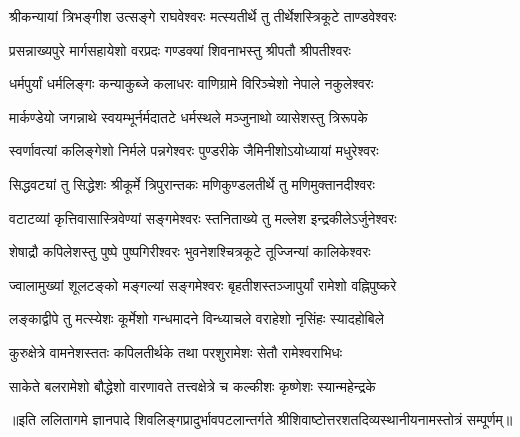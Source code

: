 \twolineshloka
{श्रीकन्यायां त्रिभङ्गीश उत्सङ्गे राघवेश्वरः}
{मत्स्यतीर्थे तु तीर्थेशस्त्रिकूटे ताण्डवेश्वरः}

\twolineshloka
{प्रसन्नाख्यपुरे मार्गसहायेशो वरप्रदः}
{गण्डक्यां शिवनाभस्तु श्रीपतौ श्रीपतीश्वरः}


\twolineshloka
{धर्मपुर्यां धर्मलिङ्गः कन्याकुब्जे कलाधरः}
{वाणिग्रामे विरिञ्चेशो नेपाले नकुलेश्वरः}

\twolineshloka
{मार्कण्डेयो जगन्नाथे स्वयम्भूर्नर्मदातटे}
{धर्मस्थले मञ्जुनाथो व्यासेशस्तु त्रिरूपके}

\twolineshloka
{स्वर्णावत्यां कलिङ्गेशो निर्मले पन्नगेश्वरः}
{पुण्डरीके जैमिनीशोऽयोध्यायां मधुरेश्वरः}

\twolineshloka
{सिद्धवट्यां तु सिद्धेशः श्रीकूर्मे त्रिपुरान्तकः}
{मणिकुण्डलतीर्थे तु मणिमुक्तानदीश्वरः}

\twolineshloka
{वटाटव्यां कृत्तिवासास्त्रिवेण्यां सङ्गमेश्वरः}
{स्तनिताख्ये तु मल्लेश इन्द्रकीलेऽर्जुनेश्वरः}

\twolineshloka
{शेषाद्रौ कपिलेशस्तु पुष्पे पुष्पगिरीश्वरः}
{भुवनेशश्चित्रकूटे तूज्जिन्यां कालिकेश्वरः}

\twolineshloka
{ज्वालामुख्यां शूलटङ्को मङ्गल्यां सङ्गमेश्वरः}
{बृहतीशस्तञ्जापुर्यां रामेशो वह्निपुष्करे}

\twolineshloka
{लङ्काद्वीपे तु मत्स्येशः कूर्मेशो गन्धमादने}
{विन्ध्याचले वराहेशो नृसिंहः स्यादहोबिले}

\twolineshloka
{कुरुक्षेत्रे वामनेशस्ततः कपिलतीर्थके}
{तथा परशुरामेशः सेतौ रामेश्वराभिधः}

\twolineshloka
{साकेते बलरामेशो बौद्धेशो वारणावते}
{तत्त्वक्षेत्रे च कल्कीशः कृष्णेशः स्यान्महेन्द्रके}

{॥इति ललितागमे ज्ञानपादे शिवलिङ्गप्रादुर्भावपटलान्तर्गते श्रीशिवाष्टोत्तरशतदिव्यस्थानीयनामस्तोत्रं सम्पूर्णम्॥}